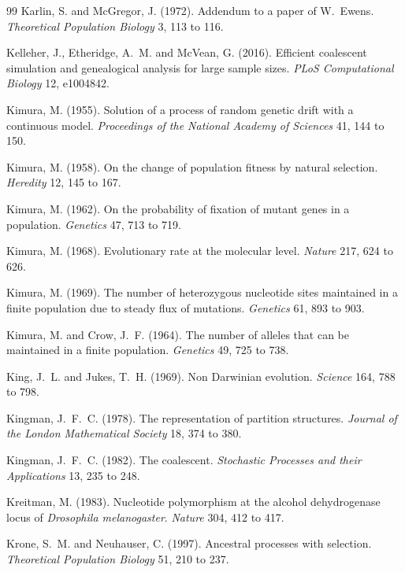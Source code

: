 \begin{thebibliography}{99}
Karlin, S. and McGregor, J. (1972). Addendum to a paper of W.~Ewens. \emph{Theoretical Population
Biology} 3, 113 to 116.

Kelleher, J., Etheridge, A.~M. and McVean, G. (2016). Efficient coalescent simulation and
genealogical analysis for large sample sizes. \emph{PLoS Computational Biology} 12, e1004842.

Kimura, M. (1955). Solution of a process of random genetic drift with a continuous model.
\emph{Proceedings of the National Academy of Sciences} 41, 144 to 150.

Kimura, M. (1958). On the change of population fitness by natural selection. \emph{Heredity} 12,
145 to 167.

Kimura, M. (1962). On the probability of fixation of mutant genes in a population.
\emph{Genetics} 47, 713 to 719.

Kimura, M. (1968). Evolutionary rate at the molecular level. \emph{Nature} 217, 624 to 626.

Kimura, M. (1969). The number of heterozygous nucleotide sites maintained in a finite population
due to steady flux of mutations. \emph{Genetics} 61, 893 to 903.

Kimura, M. and Crow, J.~F. (1964). The number of alleles that can be maintained in a finite
population. \emph{Genetics} 49, 725 to 738.

King, J.~L. and Jukes, T.~H. (1969). Non Darwinian evolution. \emph{Science} 164, 788 to 798.

Kingman, J.~F.~C. (1978). The representation of partition structures. \emph{Journal of the London
Mathematical Society} 18, 374 to 380.

Kingman, J.~F.~C. (1982). The coalescent. \emph{Stochastic Processes and their Applications} 13,
235 to 248.

Kreitman, M. (1983). Nucleotide polymorphism at the alcohol dehydrogenase locus of
\emph{Drosophila melanogaster}. \emph{Nature} 304, 412 to 417.

Krone, S.~M. and Neuhauser, C. (1997). Ancestral processes with selection. \emph{Theoretical
Population Biology} 51, 210 to 237.


\end{thebibliography}

